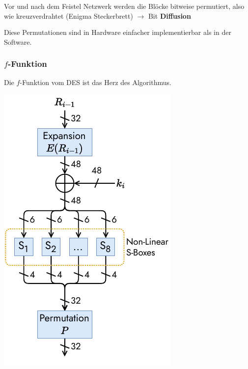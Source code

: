 \documentclass[
  10pt,
  a4paper,
  twocolumn]{article}
\begin{document}
Vor und nach dem Feistel Netzwerk werden die Blöcke bitweise permutiert,
also wie kreuzverdrahtet (Enigma Steckerbrett) \(\rightarrow\) Bit
\textbf{Diffusion}

\begin{tcolorbox}[enhanced jigsaw, toprule=.15mm, opacityback=0, colbacktitle=quarto-callout-note-color!10!white, breakable, colframe=quarto-callout-note-color-frame, title=\textcolor{quarto-callout-note-color}{\faInfo}\hspace{0.5em}{Hinweis}, left=2mm, arc=.35mm, toptitle=1mm, bottomrule=.15mm, rightrule=.15mm, titlerule=0mm, bottomtitle=1mm, leftrule=.75mm, opacitybacktitle=0.6, coltitle=black, colback=white]

Diese Permutationen sind in Hardware einfacher implementierbar als in
der Software.

\end{tcolorbox}

\subsubsection{\texorpdfstring{\(f\)-Funktion}{f-Funktion}}\label{f-funktion}

Die \(f\)-Funktion vom DES ist das Herz des Algorithmus.

\begin{center}
\includegraphics{images/crypto/des_ffunction.pdf}
\end{center}
\end{document}
